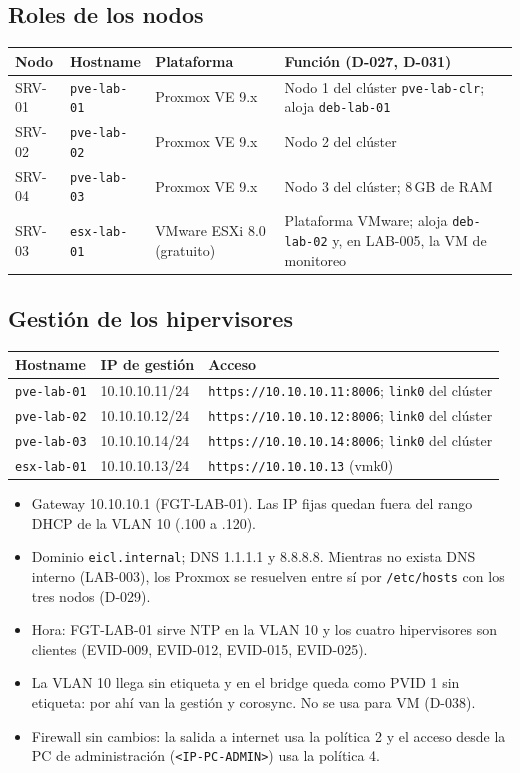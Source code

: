 \documentclass[11pt,a4paper]{article}
\newcommand{\cab}{\rowcolor{light}}
\begin{document}
\subsection{Roles de los nodos}
\begin{tabularx}{\textwidth}{L{1.6cm} L{2.4cm} L{3.4cm} Z}
  \toprule
  \cab\textbf{Nodo} & \textbf{Hostname} & \textbf{Plataforma} & \textbf{Función (D-027, D-031)}\\
  \midrule
  SRV-01 & \texttt{pve-lab-01} & Proxmox VE 9.x & Nodo 1 del clúster \texttt{pve-lab-clr}; aloja \texttt{deb-lab-01}\\
  SRV-02 & \texttt{pve-lab-02} & Proxmox VE 9.x & Nodo 2 del clúster\\
  SRV-04 & \texttt{pve-lab-03} & Proxmox VE 9.x & Nodo 3 del clúster; 8\,GB de RAM\\
  SRV-03 & \texttt{esx-lab-01} & VMware ESXi 8.0 (gratuito) & Plataforma VMware; aloja \texttt{deb-lab-02} y, en LAB-005, la VM de monitoreo\\
  \bottomrule
\end{tabularx}

\subsection{Gestión de los hipervisores}
\begin{tabularx}{\textwidth}{L{2.4cm} L{2.6cm} Z}
  \toprule
  \cab\textbf{Hostname} & \textbf{IP de gestión} & \textbf{Acceso}\\
  \midrule
  \texttt{pve-lab-01} & 10.10.10.11/24 & \texttt{https://10.10.10.11:8006}; \texttt{link0} del clúster\\
  \texttt{pve-lab-02} & 10.10.10.12/24 & \texttt{https://10.10.10.12:8006}; \texttt{link0} del clúster\\
  \texttt{pve-lab-03} & 10.10.10.14/24 & \texttt{https://10.10.10.14:8006}; \texttt{link0} del clúster\\
  \texttt{esx-lab-01} & 10.10.10.13/24 & \texttt{https://10.10.10.13} (vmk0)\\
  \bottomrule
\end{tabularx}

\begin{itemize}
  \item Gateway 10.10.10.1 (FGT-LAB-01). Las IP fijas quedan fuera del rango DHCP de la VLAN 10 (.100 a .120).
  \item Dominio \texttt{eicl.internal}; DNS 1.1.1.1 y 8.8.8.8. Mientras no exista DNS interno (LAB-003), los Proxmox se resuelven entre sí por \texttt{/etc/hosts} con los tres nodos (D-029).
  \item Hora: FGT-LAB-01 sirve NTP en la VLAN 10 y los cuatro hipervisores son clientes (EVID-009, EVID-012, EVID-015, EVID-025).
  \item La VLAN 10 llega sin etiqueta y en el bridge queda como PVID 1 sin etiqueta: por ahí van la gestión y corosync. No se usa para VM (D-038).
  \item Firewall sin cambios: la salida a internet usa la política 2 y el acceso desde la PC de administración (\texttt{<IP-PC-ADMIN>}) usa la política 4.
\end{itemize}
\end{document}
